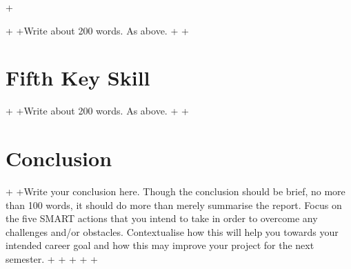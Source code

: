 +\documentclass{scrartcl}
\begin{document}
 +
 +Write about 200 words. As above.
 +
 +\section{Fifth Key Skill}
 +
 +Write about 200 words. As above.
 +
 +\section{Conclusion}
 +
 +Write your conclusion here. Though the conclusion should be brief, no more than 100 words, it should do more than merely summarise the report. Focus on the five SMART actions that you intend to take in order to overcome any challenges and/or obstacles. Contextualise how this will help you towards your intended career goal and how this may improve your project for the next semester.
 +
 +
 +
 +
 +
\end{document}
